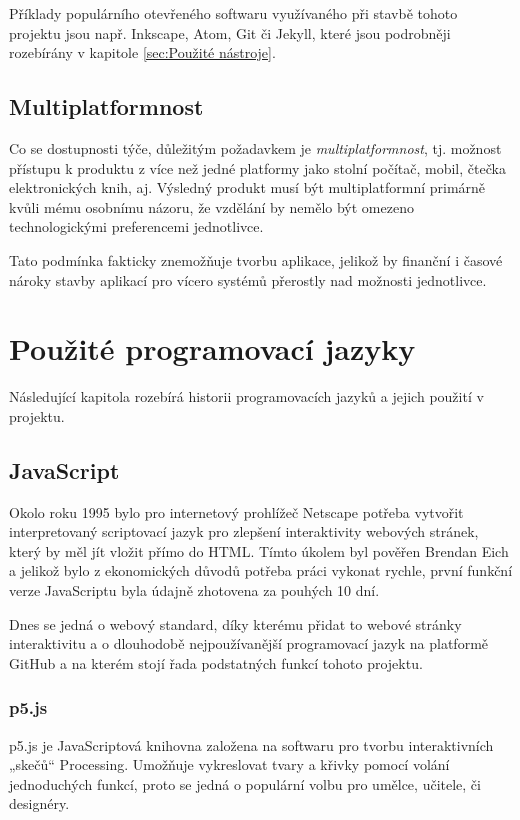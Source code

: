 \documentclass[a4paper, 12pt]{article}
\begin{document}
  Příklady populárního otevřeného softwaru využívaného při stavbě tohoto projektu jsou např. Inkscape, Atom, Git či Jekyll, které jsou podrobněji rozebírány v kapitole \ref{sec:Použité nástroje}.


  \subsection{Multiplatformnost}
  Co se dostupnosti týče, důležitým požadavkem je \emph{multiplatformnost}, tj. možnost přístupu k produktu z více než jedné platformy jako stolní počítač, mobil, čtečka elektronických knih, aj. Výsledný produkt musí být multiplatformní primárně kvůli mému osobnímu názoru, že vzdělání by nemělo být omezeno technologickými preferencemi jednotlivce.

  Tato podmínka fakticky znemožňuje tvorbu aplikace, jelikož by finanční i časové nároky stavby aplikací pro vícero systémů přerostly nad možnosti jednotlivce.


  \section{Použité programovací jazyky}
  Následující kapitola rozebírá historii programovacích jazyků a jejich použití v projektu.


  \subsection{JavaScript}
  Okolo roku 1995 bylo pro internetový prohlížeč Netscape potřeba vytvořit interpretovaný scriptovací jazyk pro zlepšení interaktivity webových stránek, který by měl jít vložit přímo do HTML. Tímto úkolem byl pověřen Brendan Eich a jelikož bylo z ekonomických důvodů potřeba práci vykonat rychle, první funkční verze JavaScriptu byla údajně zhotovena za pouhých 10 dní\cite{the-origin-of-javascript}.

  Dnes se jedná o webový standard, díky kterému přidat to webové stránky interaktivitu a o dlouhodobě nejpoužívanější programovací jazyk na platformě GitHub\cite{github-statistics} a na kterém stojí řada podstatných funkcí tohoto projektu.


  \subsubsection{p5.js} \label{sec:p5.js}
  p5.js je JavaScriptová knihovna založena na softwaru pro tvorbu interaktivních „skečů“ Processing. Umožňuje vykreslovat tvary a křivky pomocí volání jednoduchých funkcí, proto se jedná o populární volbu pro umělce, učitele, či designéry.
\end{document}
